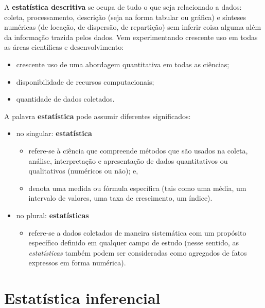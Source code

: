 \documentclass[
]{book}
\providecommand{\tightlist}{%
  \setlength{\itemsep}{0pt}\setlength{\parskip}{0pt}}
\begin{document}
A \textbf{estatística descritiva} se ocupa de tudo o que seja relacionado a dados: coleta, processamento, descrição (seja na forma tabular ou gráfica) e sínteses numéricas (de locação, de dispersão, de repartição) sem inferir coisa alguma além da informação trazida pelos dados. Vem experimentando crescente uso em todas as áreas científicas e desenvolvimento:

\begin{itemize}
\tightlist
\item
  crescente uso de uma abordagem quantitativa em todas as ciências;
\item
  disponibilidade de recursos computacionais;
\item
  quantidade de dados coletados.
\end{itemize}

A palavra \textbf{estatística} pode assumir diferentes significados:

\begin{itemize}
\tightlist
\item
  no singular: \textbf{estatística} \vspace{0.5cm}

  \begin{itemize}
  \tightlist
  \item
    refere-se à ciência que compreende métodos que são usados na coleta, análise, interpretação e apresentação de dados quantitativos ou qualitativos (numéricos ou não); e,
  \item
    denota uma medida ou fórmula específica (tais como uma média, um intervalo de valores, uma taxa de crescimento, um índice).
  \end{itemize}
\item
  no plural: \textbf{estatísticas}

  \begin{itemize}
  \tightlist
  \item
    refere-se a dados coletados de maneira sistemática com um propósito específico definido em qualquer campo de estudo (nesse sentido, as \emph{estatísticas} também podem ser consideradas como agregados de fatos expressos em forma numérica).
  \end{itemize}
\end{itemize}

\hypertarget{estatuxedstica-inferencial}{%
\section{Estatística inferencial}\label{estatuxedstica-inferencial}}
\end{document}
